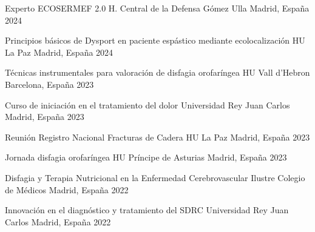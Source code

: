 

\begin{cventries}

  \cventry
    {Experto ECOSERMEF 2.0} %
    {H. Central de la Defensa Gómez Ulla} %
    {Madrid, España} %
    {2024} %
    {}

  \cventry
    {Principios básicos de Dysport en paciente espástico mediante ecolocalización} %
    {HU La Paz} %
    {Madrid, España} %
    {2024} %
    {}

  \cventry
    {Técnicas instrumentales para valoración de disfagia orofaríngea} %
    {HU Vall d'Hebron} %
    {Barcelona, España} %
    {2023} %
    {}

  \cventry
    {Curso de iniciación en el tratamiento del dolor} %
    {Universidad Rey Juan Carlos} %
    {Madrid, España} %
    {2023} %
    {}

  \cventry
    {Reunión Registro Nacional Fracturas de Cadera} %
    {HU La Paz} %
    {Madrid, España} %
    {2023} %
    {}

  \cventry
    {Jornada disfagia orofaríngea} %
    {HU Príncipe de Asturias} %
    {Madrid, España} %
    {2023} %
    {}

  \cventry
    {Disfagia y Terapia Nutricional en la Enfermedad Cerebrovascular} %
    {Ilustre Colegio de Médicos} %
    {Madrid, España} %
    {2022} %
    {}

  \cventry
    {Innovación en el diagnóstico y tratamiento del SDRC} %
    {Universidad Rey Juan Carlos} %
    {Madrid, España} %
    {2022} %
    {}


\end{cventries}
